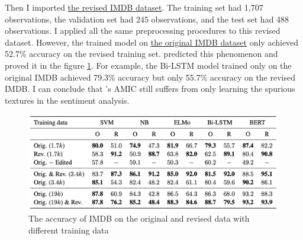 \documentclass[aoas]{imsart}
\numberwithin{equation}{section}
\theoremstyle{plain}
\theoremstyle{remark}
\begin{document}
Then I imported \href{https://github.com/acmi-lab/counterfactually-augmented-data/tree/master/sentiment/new}{the revised IMDB dataset}. The training set had 1,707 observations, the validation set had 245 observations, and the test set had 488 observations. I applied all the same preprocessing procedures to this revised dataset. However, the trained model on \href{https://github.com/acmi-lab/counterfactually-augmented-data/tree/master/sentiment/orig}{the original IMDB dataset} only achieved 52.7\% accuracy on the revised training set. \cite{DBLP:journals/corr/abs-1909-12434} predicted this phenomenon and proved it in the figure \ref{Fig21: orire}. For example, the Bi-LSTM model trained only on the original IMDB achieved 79.3\% accuracy but only 55.7\% accuracy on the revised IMDB. I can conclude that \cite{chenyu}'s AMIC still suffers from only learning the spurious textures in the sentiment analysis. 
\begin{figure}[ht]
\includegraphics[scale=0.3]{img/orire.png}
\caption{The accuracy of IMDB on the original and revised data with different training data}
\label{Fig21: orire}
\end{figure}
\end{document}
